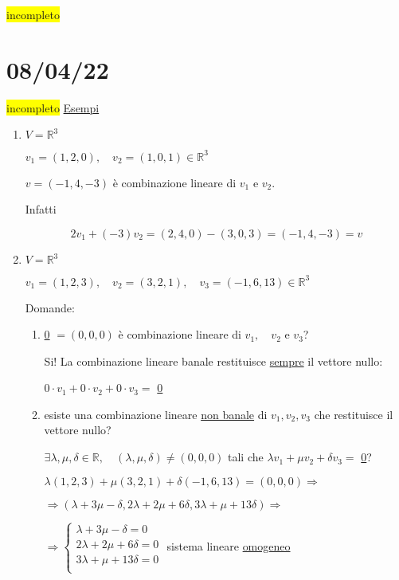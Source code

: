 \documentclass{article}
\newcommand{\hl}[1]{\colorbox{yellow}{#1}}
\newcommand{\ul}[1]{\underline{#1}}
\newcommand{\R}{\mathbb{R}}
\begin{document}
	\hl{incompleto}
	\section{08/04/22}
	\hl{incompleto}
	\ul{Esempi}
	\begin{enumerate}
		\item $V=\R^3$

		      $v_1=(1,2,0),\quad v_2=(1,0,1)\in\R^3$

		      $v=(-1,4,-3)$ è combinazione lineare di $v_1$ e $v_2$.

		      Infatti

		      $$2v_1+(-3)v_2=(2,4,0)-(3,0,3)=(-1,4,-3)=v$$
		\item $V=\R^3$

		      $v_1=(1,2,3),\quad v_2=(3,2,1),\quad v_3=(-1,6,13)\in\R^3$

		      Domande:
		      \begin{enumerate}
			      \item \ul{0} $=(0,0,0)$ è combinazione lineare di $v_1,\quad v_2$ e $v_3$?

			            Si! La combinazione lineare banale restituisce \ul{sempre} il vettore nullo:

			            $0\cdot v_1+0\cdot v_2+0\cdot v_3=$ \ul{0}

			      \item esiste una combinazione lineare \ul{non banale} di $v_1,v_2,v_3$ che restituisce il vettore nullo?

			            $\exists\lambda,\mu,\delta\in\R,\quad(\lambda,\mu,\delta)\not=(0,0,0)$ tali che $\lambda v_1+\mu v_2+\delta v_3=$ \ul{0}?

			            $\lambda(1,2,3)+\mu(3,2,1)+\delta(-1,6,13)=(0,0,0)\Rightarrow$

			            $\Rightarrow(\lambda+3\mu-\delta,2\lambda+2\mu+6\delta,3\lambda+\mu+13\delta)\Rightarrow$

			            $\Rightarrow
				            \begin{cases}
					            \lambda+3\mu-\delta=0   \\
					            2\lambda+2\mu+6\delta=0 \\
					            3\lambda+\mu+13\delta=0 \\
				            \end{cases}$ sistema lineare \ul{omogeneo}


\end{enumerate}
\end{enumerate}
\end{document}
